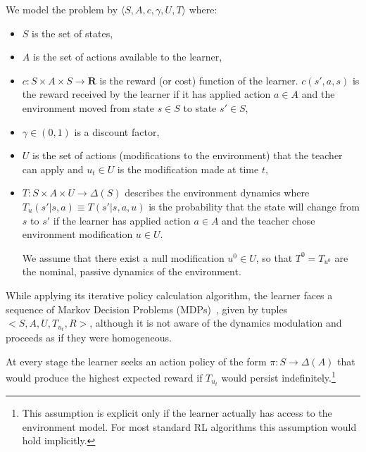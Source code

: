 We model the problem by $\langle S, A, c,\gamma, U,T\rangle$ where:
\begin{itemize}
\item $S$ is the set of states, 
\item $A$ is the set of actions available to the learner,
\item  $c:S\times A\times S\rightarrow\mathbf{R}$ is the reward (or
  cost) function of the learner. $c(s',a,s)$ is the reward received by
  the learner if it has applied action $a\in A$ and the environment
  moved from state $s\in S$ to state $s'\in S$,
\item $\gamma \in (0,1)$ is a discount factor,   

\item $U$ is the set of actions (modifications to the environment)
  that the teacher can apply and $u_t\in U$ is the modification made
  at time $t$,

\item $T:S\times A\times U\rightarrow\Delta(S)$ describes the
  environment dynamics where $T_u(s'|s,a)\equiv T(s'|s,a,u)$ is the
  probability that the state will change from $s$ to $s'$ if the
  learner has applied action $a\in A$ and the teacher chose
  environment modification $u\in U$.

We assume that there exist a null modification $u^0\in U$, so that
$T^0=T_{u^0}$ are the nominal, passive dynamics of the environment.
\end{itemize}


While applying its iterative policy calculation algorithm, the learner
faces a sequence of Markov Decision Problems (MDPs)~\cite{puterman_book_94},
 given by tuples $<S,A,U,T_{u_t},R>$, although it is not aware of the dynamics
modulation and proceeds as if they were homogeneous. 
\begin{assume}\label{assume_persistence}
At every
stage the learner seeks an action policy of the form
$\pi:S\rightarrow\Delta(A)$ that would produce the highest expected
reward if $T_{u_t}$ would persist indefinitely.\footnote{This 
  assumption is explicit only if the learner actually has access to
  the environment model. For most standard RL algorithms this
  assumption would hold implicitly.}
\end{assume}


